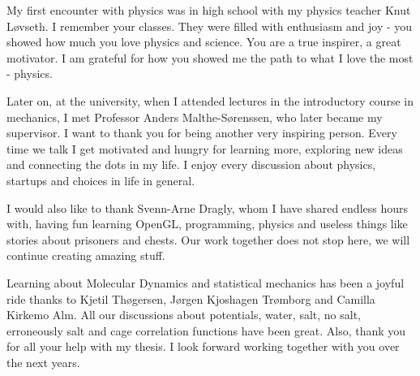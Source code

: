 My first encounter with physics was in high school with my physics teacher Knut Løvseth. I remember your classes. They were filled with enthusiasm and joy - you showed how much you love physics and science. You are a true inspirer, a great motivator. I am grateful for how you showed me the path to what I love the most - physics.

Later on, at the university, when I attended lectures in the introductory course in mechanics, I met Professor Anders Malthe-S{\o}renssen, who later became my supervisor. I want to thank you for being another very inspiring person. Every time we talk I get motivated and hungry for learning more, exploring new ideas and connecting the dots in my life. I enjoy every discussion about physics, startups and choices in life in general. 

I would also like to thank Svenn-Arne Dragly, whom I have shared endless hours with, having fun learning OpenGL, programming, physics and useless things like stories about prisoners and chests. Our work together does not stop here, we will continue creating amazing stuff.

Learning about Molecular Dynamics and statistical mechanics has been a joyful ride thanks to Kjetil Thøgersen, Jørgen Kjoshagen Trømborg and Camilla Kirkemo Alm. All our discussions about potentials, water, salt, no salt, erroneously salt and cage correlation functions have been great. Also, thank you for all your help with my thesis. I look forward working together with you over the next years.

